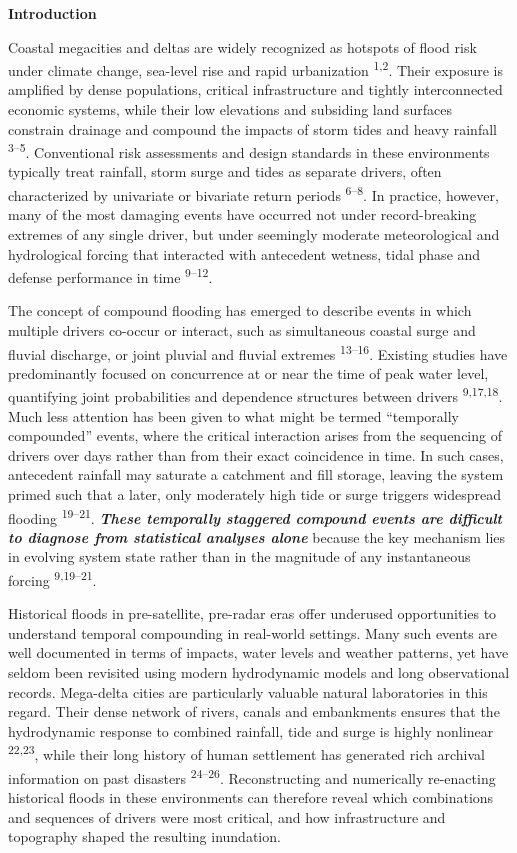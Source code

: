 \documentclass[
]{article}
\begin{document}
\textbf{Introduction}

Coastal megacities and deltas are widely recognized as hotspots of flood
risk under climate change, sea-level rise and rapid urbanization
\textsuperscript{1,2}. Their exposure is amplified by dense populations,
critical infrastructure and tightly interconnected economic systems,
while their low elevations and subsiding land surfaces constrain
drainage and compound the impacts of storm tides and heavy rainfall
\textsuperscript{3--5}. Conventional risk assessments and design
standards in these environments typically treat rainfall, storm surge
and tides as separate drivers, often characterized by univariate or
bivariate return periods \textsuperscript{6--8}. In practice, however,
many of the most damaging events have occurred not under record-breaking
extremes of any single driver, but under seemingly moderate
meteorological and hydrological forcing that interacted with antecedent
wetness, tidal phase and defense performance in time
\textsuperscript{9--12}.

The concept of compound flooding has emerged to describe events in which
multiple drivers co-occur or interact, such as simultaneous coastal
surge and fluvial discharge, or joint pluvial and fluvial extremes
\textsuperscript{13--16}. Existing studies have predominantly focused on
concurrence at or near the time of peak water level, quantifying joint
probabilities and dependence structures between drivers
\textsuperscript{9,17,18}. Much less attention has been given to what
might be termed ``temporally compounded'' events, where the critical
interaction arises from the sequencing of drivers over days rather than
from their exact coincidence in time. In such cases, antecedent rainfall
may saturate a catchment and fill storage, leaving the system primed
such that a later, only moderately high tide or surge triggers
widespread flooding \textsuperscript{19--21}. \emph{\textbf{These
temporally staggered compound events are difficult to diagnose from
statistical analyses alone}} because the key mechanism lies in evolving
system state rather than in the magnitude of any instantaneous forcing
\textsuperscript{9,19--21}.

Historical floods in pre-satellite, pre-radar eras offer underused
opportunities to understand temporal compounding in real-world settings.
Many such events are well documented in terms of impacts, water levels
and weather patterns, yet have seldom been revisited using modern
hydrodynamic models and long observational records. Mega-delta cities
are particularly valuable natural laboratories in this regard. Their
dense network of rivers, canals and embankments ensures that the
hydrodynamic response to combined rainfall, tide and surge is highly
nonlinear \textsuperscript{22,23}, while their long history of human
settlement has generated rich archival information on past disasters
\textsuperscript{24--26}. Reconstructing and numerically re-enacting
historical floods in these environments can therefore reveal which
combinations and sequences of drivers were most critical, and how
infrastructure and topography shaped the resulting inundation.
\end{document}
